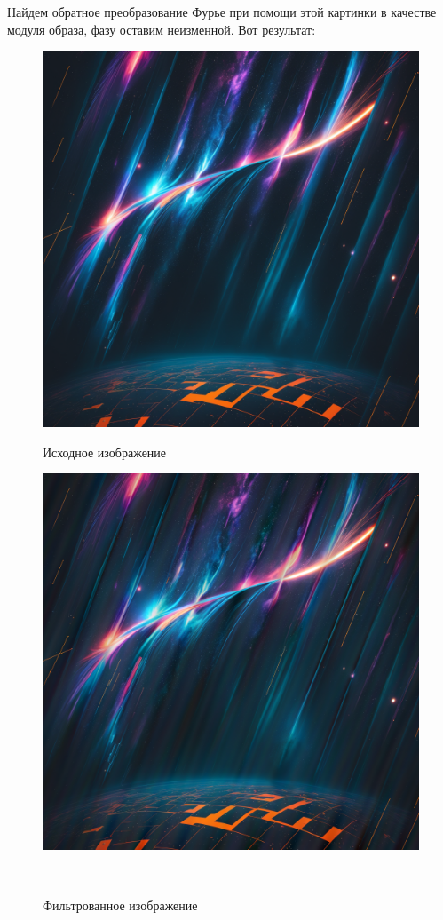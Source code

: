 \documentclass[a4paper]{article}
\begin{document}
Найдем обратное преобразование Фурье при помощи этой картинки в качестве модуля образа, фазу оставим неизменной. Вот результат:

\begin{figure}[H]
    \begin{minipage}{0.49\textwidth}
        \centering \includegraphics[width=\textwidth]{3.png}
        \caption{Исходное изображение}
    \end{minipage}\hfill
    \begin{minipage}{0.49\textwidth}
        \centering \includegraphics[width=\textwidth]{im3_recovered.png}
        \caption{Фильтрованное изображение}
    \end{minipage}\\[1em]
\end{figure}\noindent\
\end{document}
